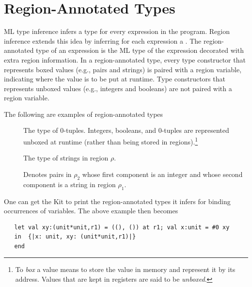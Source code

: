 \documentclass[12pt]{book}
\begin{document}
\section{Region-Annotated Types}
\label{reganntypes.sec}
ML type inference infers a type for every expression in the program.
Region inference extends this idea by inferring for each expression a
. The
region-annotated type of an expression is the ML type of the
expression decorated with extra region information.  In a
region-annotated type, every type constructor that represents boxed
values (e.g., pairs and strings) is paired with a region variable,
indicating where the value is to be put at runtime. Type constructors
that represents unboxed values (e.g., integers and booleans) are not
paired with a region variable.

The following are examples of region-annotated types
\begin{description}
\item[] The type of 0-tuples.   Integers, booleans, and 0-tuples are represented unboxed
  at runtime (rather than being stored in regions).\footnote{To {\em
      box} a value means to store the value in memory and represent it
    by its address.  Values that are kept in registers are said to be
    {\em unboxed}.}
\item[] The type of strings in region
  $\rho$.
\item[] Denotes
  pairs in $\rho_2$ whose first component is an integer and whose second
  component is a string in region $\rho_1$. 
\end{description}


One can get the Kit to print the region-annotated types it infers
for binding occurrences of variables. 
The above example then becomes
\begin{verbatim}
   let val xy:(unit*unit,r1) = ((), ()) at r1; val x:unit = #0 xy
   in  {|x: unit, xy: (unit*unit,r1)|}
   end 
\end{verbatim}
\end{document}

